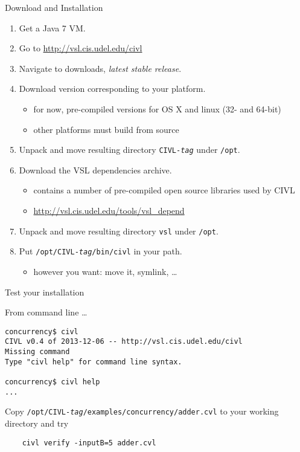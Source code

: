\documentclass[t]{beamer}
\begin{document}
\begin{frame}{Download and Installation}
  \begin{enumerate}
  \item Get a Java 7 VM.
  \item Go to \url{http://vsl.cis.udel.edu/civl}
  \item Navigate to downloads, \emph{latest stable release}.
  \item Download version corresponding to your platform.
    \begin{itemize}
    \item for now, pre-compiled versions for OS X and linux (32- and 64-bit)
    \item other platforms must build from source
    \end{itemize}
  \item Unpack and move resulting directory \texttt{CIVL-\textit{tag}}
    under \texttt{/opt}.
  \item Download the VSL dependencies archive.
    \begin{itemize}
    \item contains a number of pre-compiled open source libraries used by CIVL
    \item \url{http://vsl.cis.udel.edu/tools/vsl\_depend}
    \end{itemize}
  \item Unpack and move resulting directory \texttt{vsl} under \texttt{/opt}.
  \item Put \texttt{/opt/CIVL-\textit{tag}/bin/civl} in your path.
    \begin{itemize}
    \item however you want: move it, symlink, \ldots
    \end{itemize}
  \end{enumerate}
\end{frame}

\begin{frame}[containsverbatim]{Test your installation}

  From command line \ldots

\begin{verbatim}
concurrency$ civl
CIVL v0.4 of 2013-12-06 -- http://vsl.cis.udel.edu/civl
Missing command
Type "civl help" for command line syntax.

concurrency$ civl help
...
\end{verbatim}

Copy \texttt{/opt/CIVL-\textit{tag}/examples/concurrency/adder.cvl}
to your working directory and try

\begin{verbatim}
    civl verify -inputB=5 adder.cvl
\end{verbatim}
\end{frame}
\end{document}
